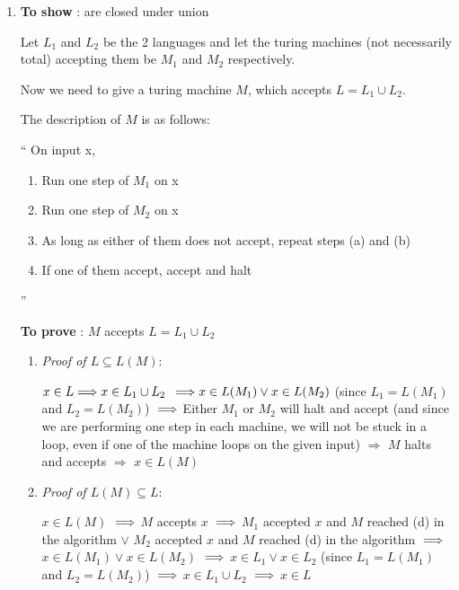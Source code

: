 \begin{enumerate}
\item \textbf{To show} : \re are closed under union
    
    Let $L_1$ and $L_2$ be the 2 \re languages and let the turing machines (not necessarily total) accepting them be $M_1$ and $M_2$ respectively.

    Now we need to give a turing machine $M$, which accepts $ L = L_1 \cup L_2 $.

    The description of $M$ is as follows:

    ``
        On input x,
        \begin{enumerate}
            \item \label{union_step_1} Run one step of $M_1$ on x
            \item \label{union_step_2} Run one step of $M_2$ on x
            \item \label{union_step_3} As long as either of them does not accept, repeat steps (a) and (b)
            \item \label{union_step_4} If one of them accept, accept and halt
        \end{enumerate}
    ''

    \textbf{To prove} : $M$ accepts $L = L_1 \cup L_2$

    \begin{enumerate}
    \item \textit{Proof of $L \subseteq L(M)$}:
            
$ 
x \in L 
\newline
\Longrightarrow 
x \in L_1 \cup L_2
$
$
\newline
\Longrightarrow
x \in L(M_1) \lor x \in L(M_2)$
(since $L_1 = L(M_1)$ and $L_2 = L(M_2)$)
$
\newline
\Longrightarrow
$
Either $M_1$ or $M_2$ will halt and accept (and since we are performing one step in each machine, we will not be stuck in a loop, even if one of the machine loops on the given input)
\newline
$\Longrightarrow$
$M$ halts and accepts
\newline
$\Longrightarrow$
$ x \in L(M)$


\item \textit{Proof of $L(M) \subseteq L$}:

$x \in L(M)$
$
\newline
\Longrightarrow
$
$M$ accepts $x$
$
\newline
\Longrightarrow
$
$M_1$ accepted $x$ and $M$ reached (d)
in the algorithm 
\newline$\lor$ $M_2$ accepted $x$ and $M$ reached (d)
in the algorithm
$
\newline
\Longrightarrow
$
$x \in L(M_1) \lor x \in L(M_2)$
$
\newline
\Longrightarrow
$
$x \in L_1 \lor x \in L_2$ (since $L_1 = L(M_1)$ and $L_2 = L(M_2)$)
$
\newline
\Longrightarrow
$
$x \in L_1 \cup L_2$
$
\newline
\Longrightarrow
$
$x \in L$



\end{enumerate}
\end{enumerate}
